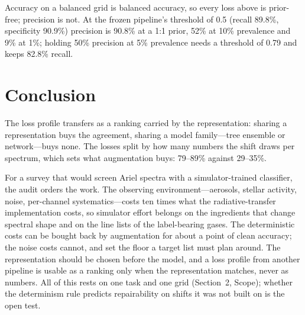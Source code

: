 \documentclass{article}
\begin{document}
Accuracy on a balanced grid is balanced accuracy, so every loss above is prior-free; precision is not. At the frozen pipeline's threshold of 0.5 (recall 89.8\%, specificity 90.9\%) precision is 90.8\% at a 1:1 prior, 52\% at 10\% prevalence and 9\% at 1\%; holding 50\% precision at 5\% prevalence needs a threshold of 0.79 and keeps 82.8\% recall.

\section{Conclusion}

The loss profile transfers as a ranking carried by the representation: sharing a representation buys the agreement, sharing a model family---tree ensemble or network---buys none. The losses split by how many numbers the shift draws per spectrum, which sets what augmentation buys: 79--89\% against 29--35\%.

For a survey that would screen Ariel spectra with a simulator-trained classifier, the audit orders the work. The observing environment---aerosols, stellar activity, noise, per-channel systematics---costs ten times what the radiative-transfer implementation costs, so simulator effort belongs on the ingredients that change spectral shape and on the line lists of the label-bearing gases. The deterministic costs can be bought back by augmentation for about a point of clean accuracy; the noise costs cannot, and set the floor a target list must plan around. The representation should be chosen before the model, and a loss profile from another pipeline is usable as a ranking only when the representation matches, never as numbers. All of this rests on one task and one grid (Section~2, Scope); whether the determinism rule predicts repairability on shifts it was not built on is the open test.
\end{document}
